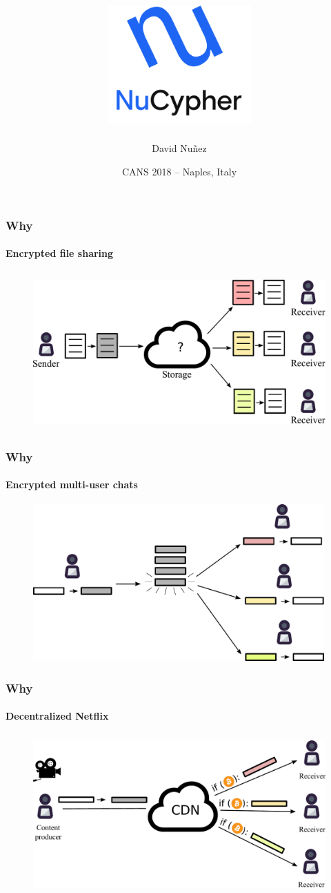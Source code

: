 \documentclass[xetex,mathsans,sans,aspectratio=169]{beamer}
\title[NuCypher]{\includegraphics[width=5.5cm]{pdf/nucypher_logo.pdf}}
\author[David Nu\~nez]{David Nu\~nez}
\date[October 3\textsuperscript{rd}, 2018]{CANS 2018 -- Naples, Italy}
\begin{document}
    \begin{frame}
        \titlepage
    \end{frame}

    \begin{frame}
        \frametitle{Why}
        \framesubtitle{Encrypted file sharing}
        \begin{figure}
            \centering
            \includegraphics[height=6cm]{pdf/file-sharing.pdf}
        \end{figure}
    \end{frame}

    \begin{frame}
        \frametitle{Why}
        \framesubtitle{Encrypted multi-user chats}
        \begin{figure}
            \centering
            \includegraphics[height=6cm]{pdf/chats.pdf}
        \end{figure}
    \end{frame}

    \begin{frame}
        \frametitle{Why}
        \framesubtitle{Decentralized Netflix}
        \begin{figure}
            \centering
            \includegraphics[height=6cm]{pdf/streams.pdf}
        \end{figure}
    \end{frame}
\end{document}
